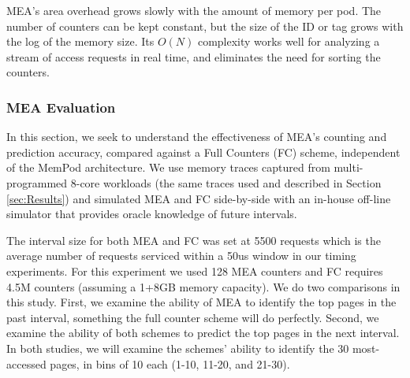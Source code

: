 MEA's area overhead grows slowly with the amount of memory per pod.  The 
number of counters can be kept constant, but the size of the 
ID or tag grows with the log of the memory size.
Its $O(N)$ complexity works well for analyzing a stream of access requests in real time, and eliminates the need for sorting the counters.


\subsubsection*{MEA Evaluation}

In this section, we seek to understand the effectiveness of MEA's counting 
and prediction accuracy, compared against a Full Counters (FC) scheme,
independent of the MemPod architecture. We use memory traces captured 
from multi-programmed 8-core workloads (the same traces used and described in Section \ref{sec:Results}) and simulated MEA and FC side-by-side with an in-house off-line simulator that provides oracle knowledge of future intervals. 

The interval size for both MEA and FC was set at 5500 requests which is the average number of requests serviced within a 50us window in our timing experiments. For this experiment we used 128 MEA counters and FC requires 4.5M counters (assuming a 1+8GB memory capacity). 
We do two comparisons in this study.  First, we examine the ability of MEA
to identify the top pages in the past interval, something the full counter
scheme will do perfectly.  Second, we examine the ability of both schemes
to predict the top pages in the next interval.  In both studies, we will
examine the schemes' ability to identify the 30 most-accessed pages, in
bins of 10 each (1-10, 11-20, and 21-30).

